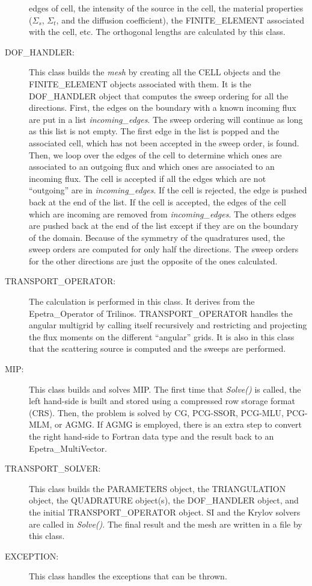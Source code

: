\begin{description}
    edges of cell, the intensity of the source in the cell, the material
    properties ($\Sigma_s$, $\Sigma_t$, and the diffusion coefficient), 
    the FINITE\_ELEMENT associated with the cell, etc. The orthogonal lengths are
    calculated by this class.
  \item[DOF\_HANDLER:] This class builds the \emph{mesh} by creating all the 
    CELL objects and the  FINITE\_ELEMENT objects associated with them. It is 
    the DOF\_HANDLER object that computes the sweep
    ordering for all the directions. First, the edges on the boundary with a
    known incoming flux are put in a list \emph{incoming\_edges}. The sweep
    ordering will continue as long as this list is not empty. The first edge 
    in the list is popped and the associated cell, which has not been
    accepted in the sweep order, is found. Then, we loop over the edges of 
    the cell to determine which ones are
    associated to an outgoing flux and which ones are associated to an
    incoming flux. The cell is accepted if all the
    edges which are not ``outgoing'' are in \emph{incoming\_edges}. If the cell is
    rejected, the edge is pushed back at the end of the list. If the cell is
    accepted, the edges of the cell which are incoming are removed from
    \emph{incoming\_edges}. The others edges are pushed back at the end of the
    list except if they are on the boundary of the domain. Because of the 
    symmetry of the quadratures used, the sweep orders are computed 
    for only half the directions. The sweep orders for the other directions 
    are just the opposite of the ones calculated.
  \item[TRANSPORT\_OPERATOR:] The calculation is performed in this class. 
    It derives from the Epetra\_Operator of Trilinos.
    TRANSPORT\_OPERATOR handles the angular multigrid by calling itself
    recursively and restricting and projecting the flux moments on the
    different ``angular'' grids. It is also in this class that the scattering 
    source is computed and the sweeps are  performed. 
  \item[MIP:] This class builds and solves MIP. The first time that
    \emph{Solve()} is called, the left hand-side is built and stored using a 
    compressed row storage format (CRS). Then, the problem is
    solved by CG, PCG-SSOR, PCG-MLU, PCG-MLM, or AGMG. If AGMG is employed, 
    there is an extra step to convert the right hand-side to Fortran data type 
    and the result back to an Epetra\_MultiVector.
  \item[TRANSPORT\_SOLVER:] This class builds the PARAMETERS object, the
    TRIANGULATION object, the QUADRATURE object(s), the DOF\_HANDLER object,
    and the initial TRANSPORT\_OPERATOR object. SI and the Krylov solvers are
    called in \emph{Solve()}. The final result and the mesh are written in a file
    by this class.
  \item[EXCEPTION:] This class handles the exceptions that can be thrown.
\end{description}
